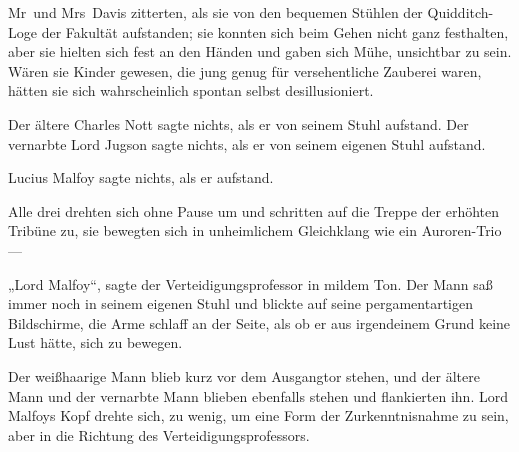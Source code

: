 \later

Mr~und Mrs~Davis zitterten, als sie von den bequemen Stühlen der Quidditch-Loge der Fakultät aufstanden; sie konnten sich beim Gehen nicht ganz festhalten, aber sie hielten sich fest an den Händen und gaben sich Mühe, unsichtbar zu sein. Wären sie Kinder gewesen, die jung genug für versehentliche Zauberei waren, hätten sie sich wahrscheinlich spontan selbst desillusioniert.

Der ältere Charles Nott sagte nichts, als er von seinem Stuhl aufstand. Der vernarbte Lord Jugson sagte nichts, als er von seinem eigenen Stuhl aufstand.

Lucius Malfoy sagte nichts, als er aufstand.

Alle drei drehten sich ohne Pause um und schritten auf die Treppe der erhöhten Tribüne zu, sie bewegten sich in unheimlichem Gleichklang wie ein Auroren-Trio—

„Lord Malfoy“, sagte der Verteidigungsprofessor in mildem Ton. Der Mann saß immer noch in seinem eigenen Stuhl und blickte auf seine pergamentartigen Bildschirme, die Arme schlaff an der Seite, als ob er aus irgendeinem Grund keine Lust hätte, sich zu bewegen.

Der weißhaarige Mann blieb kurz vor dem Ausgangtor stehen, und der ältere Mann und der vernarbte Mann blieben ebenfalls stehen und flankierten ihn. Lord Malfoys Kopf drehte sich, zu wenig, um eine Form der Zurkenntnisnahme zu sein, aber in die Richtung des Verteidigungsprofessors.


